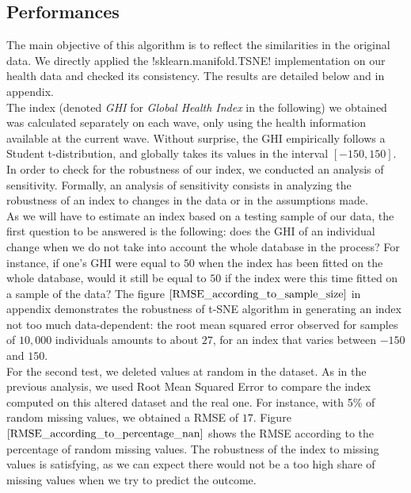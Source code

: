 \documentclass[]{article}
\begin{document}
\subsection{Performances}
The main objective of this algorithm is to reflect the similarities in the original data. We directly applied the \pyth!sklearn.manifold.TSNE! implementation on our health data and checked its consistency. The results are detailed below and in appendix.\\

\noindent
The index (denoted \textit{GHI} for \textit{Global Health Index} in the following) we obtained was calculated separately on each wave, only using the health information available at the current wave. Without surprise, the GHI empirically follows a Student t-distribution, and globally takes its values in the interval $[-150, 150]$.\\

\noindent
In order to check for the robustness of our index, we conducted an analysis of sensitivity. Formally, an analysis of sensitivity consists in analyzing the robustness of an index to changes in the data or in the assumptions made.\\
As we will have to estimate an index based on a testing sample of our data, the first question to be answered is the following: does the GHI of an individual change when we do not take into account the whole database in the process? For instance, if one's GHI were equal to $50$ when the index has been fitted on the whole database, would it still be equal to $50$ if the index were this time fitted on a sample of the data? The figure $\ref{RMSE_according_to_sample_size}$ in appendix demonstrates the robustness of t-SNE algorithm in generating an index not too much data-dependent: the root mean squared error observed for samples of $10,000$ individuals amounts to about $27$, for an index that varies between $-150$ and $150$.\\
For the second test, we deleted values at random in the dataset. As in the previous analysis, we used Root Mean Squared Error to compare the index computed on this altered dataset and the real one. For instance, with 5\% of random missing values, we obtained a RMSE of $17$. Figure $\ref{RMSE_according_to_percentage_nan}$ shows the RMSE according to the percentage of random missing values. The robustness of the index to missing values is satisfying, as we can expect there would not be a too high share of missing values when we try to predict the outcome.\\
\end{document}
